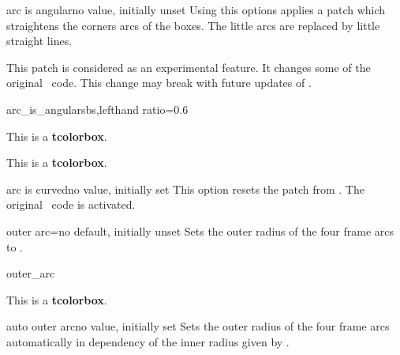 \clearpage
\begin{docTcbKey}[][doc new=2015-05-05]{arc is angular}{}{no value, initially unset}
  Using this options applies a patch which straightens the corners arcs of
  the boxes. The little arcs are replaced by little straight lines.
  \begin{marker}
  This patch is considered as an experimental feature.
  It changes some of the original \tikzname\ code. This change may break
  with future updates of \tikzname.
  \end{marker}

\begin{exdispExample*}{arc_is_angular}{sbs,lefthand ratio=0.6}

\begin{tcolorbox}
This is a \textbf{tcolorbox}.
\end{tcolorbox}
\begin{tcolorbox}
This is a \textbf{tcolorbox}.
\end{tcolorbox}
\end{exdispExample*}

\end{docTcbKey}


\begin{docTcbKey}[][doc new=2015-05-05]{arc is curved}{}{no value, initially set}
  This option resets the patch from . The
  original \tikzname\ code is activated.
\end{docTcbKey}


\begin{docTcbKey}{outer arc}{=}{no default, initially unset}
  Sets the outer radius of the four frame arcs to .
\begin{exdispExample}{outer_arc}

\begin{tcolorbox}[arc=4mm,outer arc=1mm]
This is a \textbf{tcolorbox}.
\end{tcolorbox}
\end{exdispExample}
\end{docTcbKey}


\begin{docTcbKey}{auto outer arc}{}{no value, initially set}
  Sets the outer radius of the four frame arcs automatically in
  dependency of the inner radius given by .
\end{docTcbKey}


